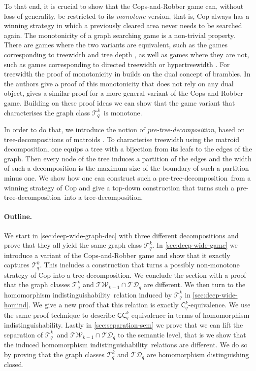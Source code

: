\documentclass{lmcs}
\theoremstyle{plain}\newtheorem{claim}[thm]{Claim}   %
\newcommand{\cT}{\ensuremath{\mathcal T}}
\newcommand	{\homInd}			{homomorphism indistinguishability}
\newcommand	{\homDistCl}		{homomorphism distinguishing closed}
\newcommand{\TW}{\ensuremath{\mathcal{TW}}}
\newcommand{\TD}{\ensuremath{\mathcal{TD}}}
\newcommand{\Ekq}{\ensuremath{\cT_{q}^{k}}}
\newcommand{\lC} {\ensuremath{\mathsf C}}
\newcommand{\lGC}{\ensuremath{\mathsf{GC}}}
\newcommand{\preTreeDec}{pre-tree-decomposition}
\begin{document}
To that end, it is crucial to show that the Cops-and-Robber game can, without loss of generality, be restricted to its \emph{monotone} version, 
that is, Cop always has a winning strategy in which a previously cleared area never needs to be searched again.
The monotonicity of a graph searching game is a non-trivial property.
There are games where the two variants are equivalent, such as the games corresponding to treewidth \cite{Seymour_graph_1993} and tree depth \cite{Giannopoulou_lifo-search_2012}, as well as games where they are not, such as games corresponding to directed treewidth \cite{Kreutzer_digraph-decomp_2O11} or hypertreewidth \cite{Adler_monotone-marshal_2004, Gottlob_marshals_2003}.
For treewidth the proof of monotonicity in \cite{Seymour_graph_1993} builds on the dual concept of brambles.
In \cite{Mazoit_monotonicity_2008} the authors give a proof of this monotonicity that does not rely on any dual object, \cite{Adler_games_2009} gives a similar proof for a more general variant of the Cops-and-Robber game.
Building on these proof ideas we can show that the game variant that characterises the graph class \Ekq\ is monotone.

In order to do that, we introduce the notion of \emph{\preTreeDec}, based on tree-decompositions of matroids \cite{Hlineny_mtw_2006, Hlineny_addendum-mtw_2009}.
To characterise treewidth using the matroid decomposition, one equips a tree with a bijection from its leafs to the edges of the graph.
Then every node of the tree induces a partition of the edges and the width of such a decomposition is the maximum size of the boundary of such a partition minus one.
We show how one can construct such a \preTreeDec\ from a winning strategy of Cop and give a top-down construction that turns such a \preTreeDec\ into a tree-decomposition.

\paragraph*{Outline.}
We start in \autoref{sec:deep-wide-graph-dec} with three different decompositions and prove that they all yield the same graph class \Ekq.
In \autoref{sec:deep-wide-game} we introduce a variant of the Cops-and-Robber game and show that it exactly captures \Ekq.
This includes a construction that turns a possibly non-monotone strategy of Cop into a tree-decomposition.
We conclude the section with a proof that the graph classes $\Ekq$ and $\TW_{k-1}\cap\TD_q$ are different.
We then turn to the \homInd\ relation induced by $\Ekq$ in \autoref{sec:deep-wide-homind}.
We give a new proof that this relation is exactly $\lC^k_q$-equivalence.
We use the same proof technique to describe $\lGC^k_q$-equivalence in terms of \homInd.
Lastly in \autoref{sec:separation-sem} we prove that we can lift the separation of \Ekq\ and $\TW_{k-1}\cap\TD_q$ to the semantic level, that is we show that the induced \homInd\ relations are different.
We do so by proving that the graph classes $\Ekq$ and $\mathcal{TD}_q$ are \homDistCl.
\end{document}
